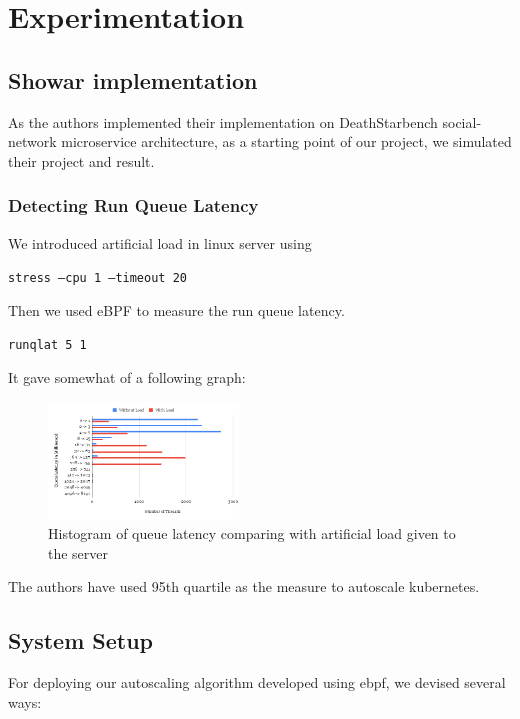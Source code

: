 \documentclass[conference]{IEEEtran}
\begin{document}
\section{Experimentation}

\subsection{Showar\cite{bShowar} implementation}

As the authors implemented their implementation on DeathStarbench social-network microservice architecture, as a starting point of our project, we simulated their project and result.

\subsubsection{Detecting Run Queue Latency}

We introduced artificial load in linux server using 

\texttt{stress --cpu  1 --timeout 20}

Then we used eBPF to measure the run queue latency.

\texttt{runqlat 5 1}

It gave somewhat of a following graph:

\begin{figure}[!h]
    \begin{center}
        \includegraphics[width=0.45\textwidth]{figures/runqlat.png}
    \end{center}
    \caption{Histogram of queue latency comparing with artificial load given to the server}
    \label{fig:}
\end{figure}

The authors have used 95th quartile as the measure to autoscale kubernetes.

\subsection{System Setup}

For deploying our autoscaling algorithm developed using ebpf, we devised several ways:
\end{document}
